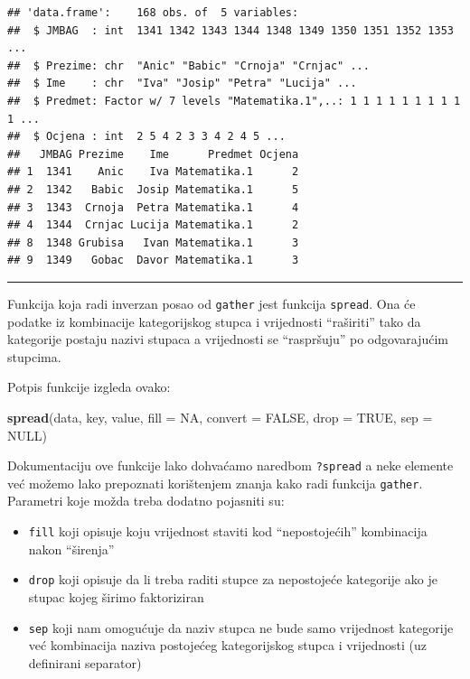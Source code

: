 \documentclass[]{book}
\newenvironment{Shaded}{\begin{snugshade}}{\end{snugshade}}
\newcommand{\KeywordTok}[1]{\textcolor[rgb]{0.13,0.29,0.53}{\textbf{#1}}}
\newcommand{\DataTypeTok}[1]{\textcolor[rgb]{0.13,0.29,0.53}{#1}}
\newcommand{\OtherTok}[1]{\textcolor[rgb]{0.56,0.35,0.01}{#1}}
\newcommand{\NormalTok}[1]{#1}
\providecommand{\tightlist}{%
  \setlength{\itemsep}{0pt}\setlength{\parskip}{0pt}}
\theoremstyle{definition}
\theoremstyle{definition}
\theoremstyle{definition}
\theoremstyle{remark}
\begin{document}
\begin{verbatim}
## 'data.frame':    168 obs. of  5 variables:
##  $ JMBAG  : int  1341 1342 1343 1344 1348 1349 1350 1351 1352 1353 ...
##  $ Prezime: chr  "Anic" "Babic" "Crnoja" "Crnjac" ...
##  $ Ime    : chr  "Iva" "Josip" "Petra" "Lucija" ...
##  $ Predmet: Factor w/ 7 levels "Matematika.1",..: 1 1 1 1 1 1 1 1 1 1 ...
##  $ Ocjena : int  2 5 4 2 3 3 4 2 4 5 ...
##   JMBAG Prezime    Ime      Predmet Ocjena
## 1  1341    Anic    Iva Matematika.1      2
## 2  1342   Babic  Josip Matematika.1      5
## 3  1343  Crnoja  Petra Matematika.1      4
## 4  1344  Crnjac Lucija Matematika.1      2
## 8  1348 Grubisa   Ivan Matematika.1      3
## 9  1349   Gobac  Davor Matematika.1      3
\end{verbatim}

\begin{center}\rule{0.5\linewidth}{\linethickness}\end{center}

Funkcija koja radi inverzan posao od \texttt{gather} jest funkcija
\texttt{spread}. Ona će podatke iz kombinacije kategorijskog stupca i
vrijednosti ``raširiti'' tako da kategorije postaju nazivi stupaca a
vrijednosti se ``raspršuju'' po odgovarajućim stupcima.

Potpis funkcije izgleda ovako:

\begin{Shaded}
\begin{Highlighting}[]
\KeywordTok{spread}\NormalTok{(data, key, value, }\DataTypeTok{fill =} \OtherTok{NA}\NormalTok{, }\DataTypeTok{convert =} \OtherTok{FALSE}\NormalTok{, }\DataTypeTok{drop =} \OtherTok{TRUE}\NormalTok{, }\DataTypeTok{sep =} \OtherTok{NULL}\NormalTok{)}
\end{Highlighting}
\end{Shaded}

Dokumentaciju ove funkcije lako dohvaćamo naredbom \texttt{?spread} a
neke elemente već možemo lako prepoznati korištenjem znanja kako radi
funkcija \texttt{gather}. Parametri koje možda treba dodatno pojasniti
su:

\begin{itemize}
\tightlist
\item
  \texttt{fill} koji opisuje koju vrijednost staviti kod
  ``nepostojećih'' kombinacija nakon ``širenja''
\item
  \texttt{drop} koji opisuje da li treba raditi stupce za nepostojeće
  kategorije ako je stupac kojeg širimo faktoriziran
\item
  \texttt{sep} koji nam omogućuje da naziv stupca ne bude samo
  vrijednost kategorije već kombinacija naziva postojećeg kategorijskog
  stupca i vrijednosti (uz definirani separator)
\end{itemize}
\end{document}
